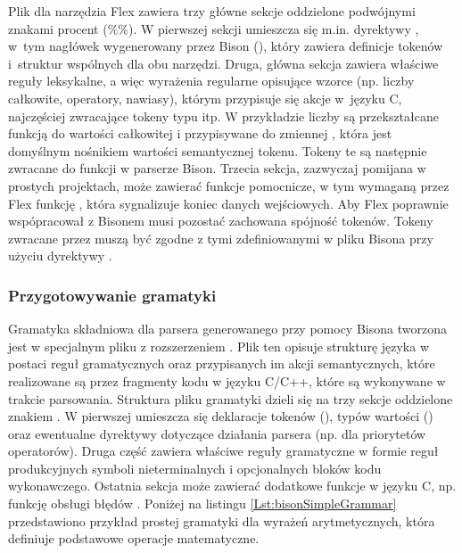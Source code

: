 \documentclass[12pt,twoside]{article}
\begin{document}


Plik dla narzędzia Flex zawiera trzy główne sekcje oddzielone podwójnymi znakami procent (\%\%). W pierwszej sekcji umieszcza się m.in. dyrektywy , w~tym nagłówek wygenerowany przez Bison (), który zawiera definicje tokenów i~struktur wspólnych dla obu narzędzi. Druga, główna sekcja zawiera właściwe reguły leksykalne, a więc wyrażenia regularne opisujące wzorce (np. liczby całkowite, operatory, nawiasy), którym przypisuje się akcje w~języku C, najczęściej zwracające tokeny typu  itp. W przykładzie liczby są przekształcane funkcją  do wartości całkowitej i przypisywane do zmiennej , która jest domyślnym nośnikiem wartości semantycznej tokenu. Tokeny te są następnie zwracane do funkcji  w parserze Bison. Trzecia sekcja, zazwyczaj pomijana w prostych projektach, może zawierać funkcje pomocnicze, w tym wymaganą przez Flex funkcję , która sygnalizuje koniec danych wejściowych. Aby Flex poprawnie wspópracował z Bisonem musi pozostać zachowana spójność tokenów. Tokeny zwracane przez  muszą być zgodne z tymi zdefiniowanymi w pliku  Bisona przy użyciu dyrektywy . 

\subsubsection{Przygotowywanie gramatyki}
Gramatyka składniowa dla parsera generowanego przy pomocy Bisona tworzona jest w specjalnym pliku z rozszerzeniem . Plik ten opisuje strukturę języka w postaci reguł gramatycznych oraz przypisanych im akcji semantycznych, które realizowane są przez fragmenty kodu w języku C/C++, które są wykonywane w trakcie parsowania. Struktura pliku gramatyki dzieli się na trzy sekcje oddzielone znakiem \kod{\%\%}. W pierwszej umieszcza się deklaracje tokenów (), typów wartości () oraz ewentualne dyrektywy dotyczące działania parsera (np.  dla priorytetów operatorów). Druga część zawiera właściwe reguły gramatyczne w formie reguł produkcyjnych symboli nieterminalnych i opcjonalnych bloków kodu wykonawczego. Ostatnia sekcja może zawierać dodatkowe funkcje w języku C, np. funkcję obsługi błędów . Poniżej na listingu \ref{Lst:bisonSimpleGrammar} przedstawiono przykład prostej gramatyki dla wyrażeń arytmetycznych, która definiuje podstawowe operacje matematyczne.
\end{document}
